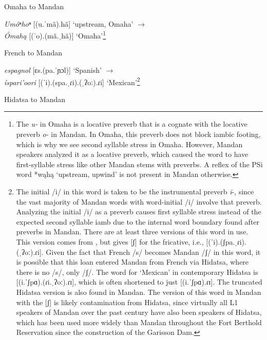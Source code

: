 \begin{exe}
\begin{xlist}
\item\label{mandanborrowings3} Omaha to Mandan \citep{larson2005}

\textit{Umóⁿhoⁿ} [(u.ˈmã).hã] `upstream, Omaha' $\to$\\
	\textit{Ómahą} [(ˈo).(mã.ˌhã)] `Omaha'\footnote{The \textit{u-} in Omaha is a locative preverb that is a cognate with the locative preverb \textit{o-} in Mandan. In Omaha, this preverb does not block iambic footing, which is why we see second syllable stress in Omaha. However, Mandan speakers analyzed it as a locative preverb, which caused the word to have first-syllable stress like other Mandan stems with preverbs. A reflex of the PSi word *wąhą `upstream, upwind' is not present in Mandan otherwise.}

\item\label{mandanborrowings4} French to Mandan \citep[4]{littleowl1992}

\textit{espagnol} [ɛs.(pa.ˈɲɔl)] `Spanish' $\to$\\
	\textit{íspari'oori} [(ˈi).(spa.ˌɾi).(ˌʔoː).ɾi] `Mexican'\footnote{The initial /i/ in this word is taken to be the instrumental preverb \textit{i}-, since the vast majority of Mandan words with word-initial /i/ involve that preverb. Analyzing the initial /i/ as a preverb causes first syllable stress instead of the expected second syllable iamb due to the internal word boundary found after preverbs in Mandan. There are at least three versions of this word in use. This version comes from \citet[4]{littleowl1992}, but \citet[95]{hollow1970} gives [ʃ] for the fricative, i.e., [(ˈi).(ʃpa.ˌɾi).(ˌʔoː).ɾi]. Given the fact that French /s/ becomes Mandan /ʃ/ in this word, it is possible that this loan entered Mandan from French via Hidatsa, where there is no /s/, only /ʃ/. The word for `Mexican' in contemporary Hidatsa is [(i.ˈʃpɑ).(ɾi.ˌʔoː).ɾɪ], which is often shortened to just [(i.ˈʃpɑ).ɾɪ]. The truncated Hidatsa version is also found in Mandan. The version of this word in Mandan with the [ʃ] is likely contamination from Hidatsa, since virtually all L1 speakers of Mandan over the past century have also been speakers of Hidatsa, which has been used more widely than Mandan throughout the Fort Berthold Reservation since the construction of the Garisson Dam.}

\newpage
\item\label{mandanborrowings5} Hidatsa to Mandan \citep[193]{matthews1877}


\end{xlist}
\end{exe}
